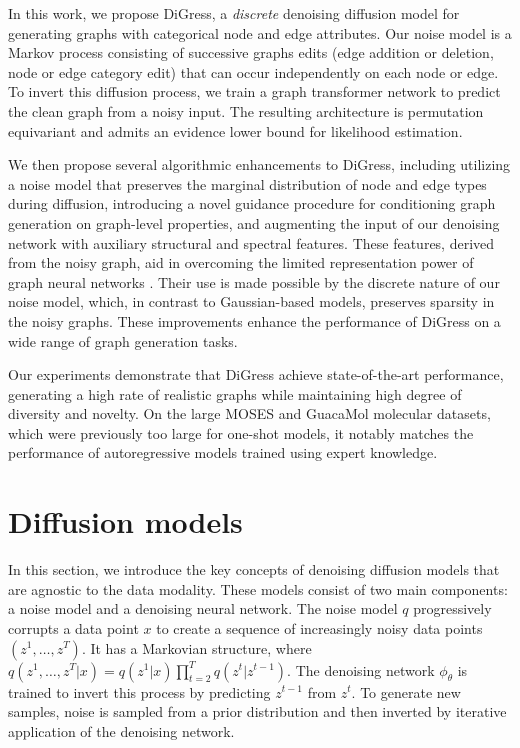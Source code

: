 \documentclass{article} %
\theoremstyle{plain}
\theoremstyle{definition}
\theoremstyle{remark}
\begin{document}
In this work, we propose DiGress, a \emph{discrete} denoising diffusion model for generating graphs with categorical node and edge attributes.
Our noise model is a Markov process consisting of successive graphs edits (edge addition or deletion, node or edge category edit) that can occur independently on each node or edge.
To invert this diffusion process, we train a graph transformer network to predict the clean graph from a noisy input. The resulting architecture is permutation equivariant and admits an evidence lower bound for likelihood estimation.


We then propose several algorithmic enhancements to DiGress, including utilizing a noise model that preserves the marginal distribution of node and edge types during diffusion, introducing a novel guidance procedure for conditioning graph generation on graph-level properties, and augmenting the input of our denoising network with auxiliary structural and spectral features. These features, derived from the noisy graph, aid in overcoming the limited representation power of graph neural networks \citep{xu2018powerful}. Their use is made possible by the discrete nature of our noise model, which, in contrast to Gaussian-based models, preserves sparsity in the noisy graphs. These improvements enhance the performance of DiGress on a wide range of graph generation tasks.

Our experiments demonstrate that DiGress achieve state-of-the-art performance, generating a high rate of realistic graphs while maintaining high degree of diversity and novelty. On the large MOSES and GuacaMol molecular datasets, which were previously too large for one-shot models, it notably matches the performance of autoregressive models trained using expert knowledge.


\section{Diffusion models}


In this section, we introduce the key concepts of denoising diffusion models that are agnostic to the data modality. These models consist of two main components: a noise model and a denoising neural network.
The noise model $q$ progressively corrupts a data point $x$ to create a sequence of increasingly noisy data points $(z^1, \dots, z^T)$. It has a Markovian structure, where $q(z^1, \dots, z^T | x) = q(z^1 | x) \prod_{t=2}^T q(z^t | z^{t-1})$. The denoising network $\phi_\theta$ is trained to invert this process by predicting $z^{t-1}$ from $z^t$. To generate new samples, noise is sampled from a prior distribution and then inverted by iterative application of the denoising network.
\end{document}
